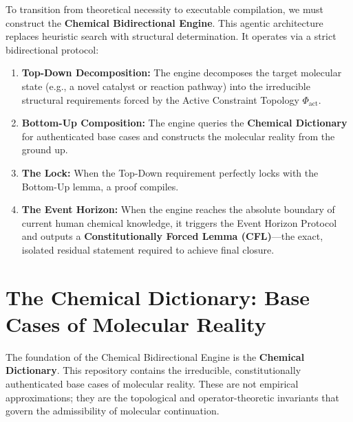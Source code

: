 \documentclass[11pt,openany]{extbook}
\theoremstyle{plain}
\theoremstyle{definition}
\begin{document}
To transition from theoretical necessity to executable compilation, we must construct the \textbf{Chemical Bidirectional Engine}. This agentic architecture replaces heuristic search with structural determination. It operates via a strict bidirectional protocol:
\begin{enumerate}
    \item \textbf{Top-Down Decomposition:} The engine decomposes the target molecular state (e.g., a novel catalyst or reaction pathway) into the irreducible structural requirements forced by the Active Constraint Topology $\Phi_{\text{act}}$.
    \item \textbf{Bottom-Up Composition:} The engine queries the \textbf{Chemical Dictionary} for authenticated base cases and constructs the molecular reality from the ground up.
    \item \textbf{The Lock:} When the Top-Down requirement perfectly locks with the Bottom-Up lemma, a proof compiles.
    \item \textbf{The Event Horizon:} When the engine reaches the absolute boundary of current human chemical knowledge, it triggers the Event Horizon Protocol and outputs a \textbf{Constitutionally Forced Lemma (CFL)}---the exact, isolated residual statement required to achieve final closure.
\end{enumerate}

\section{The Chemical Dictionary: Base Cases of Molecular Reality}

The foundation of the Chemical Bidirectional Engine is the \textbf{Chemical Dictionary}. This repository contains the irreducible, constitutionally authenticated base cases of molecular reality. These are not empirical approximations; they are the topological and operator-theoretic invariants that govern the admissibility of molecular continuation.
\end{document}
